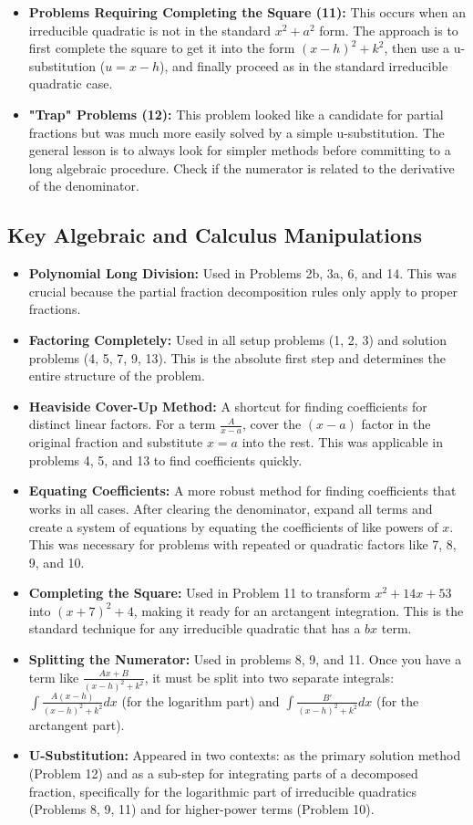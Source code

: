 \documentclass{article}
\begin{document}
\begin{itemize}
    \item \textbf{Problems Requiring Completing the Square (11):} This occurs when an irreducible quadratic is not in the standard $x^2+a^2$ form. The approach is to first complete the square to get it into the form $(x-h)^2+k^2$, then use a u-substitution ($u=x-h$), and finally proceed as in the standard irreducible quadratic case.
    \item \textbf{"Trap" Problems (12):} This problem looked like a candidate for partial fractions but was much more easily solved by a simple u-substitution. The general lesson is to always look for simpler methods before committing to a long algebraic procedure. Check if the numerator is related to the derivative of the denominator.
\end{itemize}

\subsection{Key Algebraic and Calculus Manipulations}
\begin{itemize}
    \item \textbf{Polynomial Long Division:} Used in Problems 2b, 3a, 6, and 14. This was crucial because the partial fraction decomposition rules only apply to proper fractions.
    \item \textbf{Factoring Completely:} Used in all setup problems (1, 2, 3) and solution problems (4, 5, 7, 9, 13). This is the absolute first step and determines the entire structure of the problem.
    \item \textbf{Heaviside Cover-Up Method:} A shortcut for finding coefficients for distinct linear factors. For a term $\frac{A}{x-a}$, cover the $(x-a)$ factor in the original fraction and substitute $x=a$ into the rest. This was applicable in problems 4, 5, and 13 to find coefficients quickly.
    \item \textbf{Equating Coefficients:} A more robust method for finding coefficients that works in all cases. After clearing the denominator, expand all terms and create a system of equations by equating the coefficients of like powers of $x$. This was necessary for problems with repeated or quadratic factors like 7, 8, 9, and 10.
    \item \textbf{Completing the Square:} Used in Problem 11 to transform $x^2+14x+53$ into $(x+7)^2+4$, making it ready for an arctangent integration. This is the standard technique for any irreducible quadratic that has a $bx$ term.
    \item \textbf{Splitting the Numerator:} Used in problems 8, 9, and 11. Once you have a term like $\frac{Ax+B}{(x-h)^2+k^2}$, it must be split into two separate integrals: $\int\frac{A(x-h)}{(x-h)^2+k^2}dx$ (for the logarithm part) and $\int\frac{B'}{(x-h)^2+k^2}dx$ (for the arctangent part).
    \item \textbf{U-Substitution:} Appeared in two contexts: as the primary solution method (Problem 12) and as a sub-step for integrating parts of a decomposed fraction, specifically for the logarithmic part of irreducible quadratics (Problems 8, 9, 11) and for higher-power terms (Problem 10).
\end{itemize}
\end{document}
